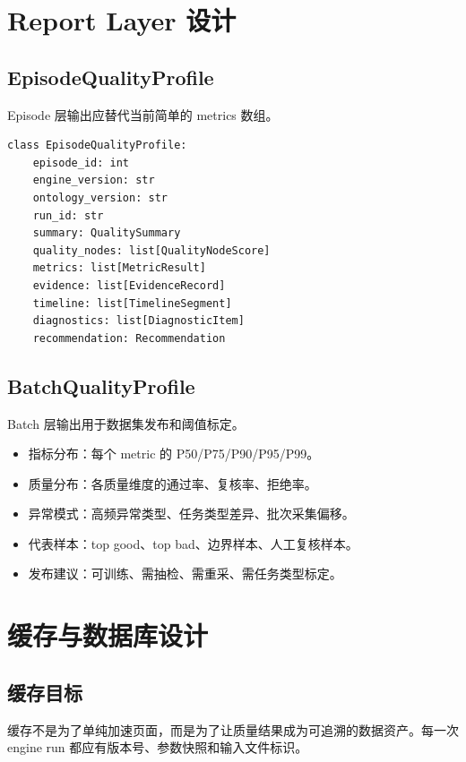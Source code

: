 \documentclass[UTF8,zihao=-4]{ctexart}
\begin{document}
\section{Report Layer 设计}

\subsection{EpisodeQualityProfile}

Episode 层输出应替代当前简单的 metrics 数组。

\begin{verbatim}
class EpisodeQualityProfile:
    episode_id: int
    engine_version: str
    ontology_version: str
    run_id: str
    summary: QualitySummary
    quality_nodes: list[QualityNodeScore]
    metrics: list[MetricResult]
    evidence: list[EvidenceRecord]
    timeline: list[TimelineSegment]
    diagnostics: list[DiagnosticItem]
    recommendation: Recommendation
\end{verbatim}

\subsection{BatchQualityProfile}

Batch 层输出用于数据集发布和阈值标定。

\begin{itemize}
\item 指标分布：每个 metric 的 P50/P75/P90/P95/P99。
\item 质量分布：各质量维度的通过率、复核率、拒绝率。
\item 异常模式：高频异常类型、任务类型差异、批次采集偏移。
\item 代表样本：top good、top bad、边界样本、人工复核样本。
\item 发布建议：可训练、需抽检、需重采、需任务类型标定。
\end{itemize}

\section{缓存与数据库设计}

\subsection{缓存目标}

缓存不是为了单纯加速页面，而是为了让质量结果成为可追溯的数据资产。每一次 engine run 都应有版本号、参数快照和输入文件标识。
\end{document}

